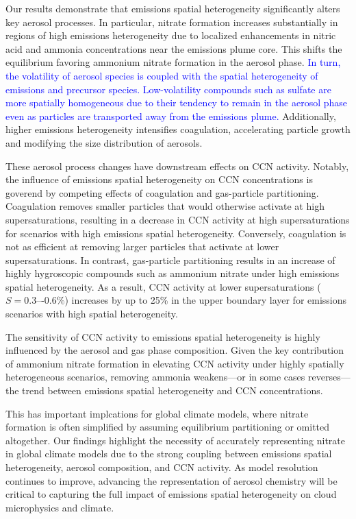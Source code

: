 \documentclass[journal abbreviation, manuscript]{copernicus}
\begin{document}
Our results demonstrate that emissions spatial heterogeneity
significantly alters key aerosol processes. In particular, nitrate
formation increases substantially in regions of high emissions
heterogeneity due to localized enhancements in nitric acid and ammonia
concentrations near the emissions plume core. This shifts the
equilibrium favoring ammonium nitrate formation in the aerosol
phase. \textcolor{blue}{In turn, the volatility of aerosol species is coupled with the 
spatial heterogeneity of emissions and precursor species. 
Low-volatility compounds such as sulfate are more spatially homogeneous
due to their tendency to remain in the aerosol phase even as particles 
are transported away from the emissions plume.}
Additionally, higher emissions heterogeneity intensifies
coagulation, accelerating particle growth and modifying the size
distribution of aerosols.

These aerosol process changes have downstream effects on CCN
activity. Notably, the influence of emissions spatial heterogeneity on
CCN concentrations is goverend by competing effects of coagulation and
gas-particle partitioning. Coagulation removes smaller particles that
would otherwise activate at high supersaturations, resulting in a
decrease in CCN activity at high supersaturations for scenarios with
high emissions spatial heterogeneity. Conversely, coagulation is not
as efficient at removing larger particles that activate at lower
supersaturations. In contrast, gas-particle partitioning results in an
increase of highly hygroscopic compounds such as ammonium nitrate
under high emissions spatial heterogeneity. As a result, CCN activity
at lower supersaturations ($S = 0.3\mbox{–-}0.6\%$) increases by up to
25\% in the upper boundary layer for emissions scenarios with high
spatial heterogeneity.

The sensitivity of CCN activity to emissions spatial heterogeneity is highly
influenced by the aerosol and gas phase composition. Given the key
contribution of ammonium nitrate formation in elevating CCN activity
under highly spatially heterogeneous scenarios, removing ammonia
weakens---or in some cases reverses---the trend between emissions
spatial heterogeneity and CCN concentrations.

This has important implcations for global climate models, where 
nitrate formation is often simplified by assuming equilibrium partitioning 
or omitted altogether. Our findings highlight the necessity of accurately 
representing nitrate in global climate models due to the strong coupling 
between emissions spatial heterogeneity, aerosol composition, and 
CCN activity. As model resolution continues to improve, advancing the 
representation of aerosol chemistry will be critical to capturing the full impact of
emissions spatial heterogeneity on cloud microphysics and climate.
\end{document}
